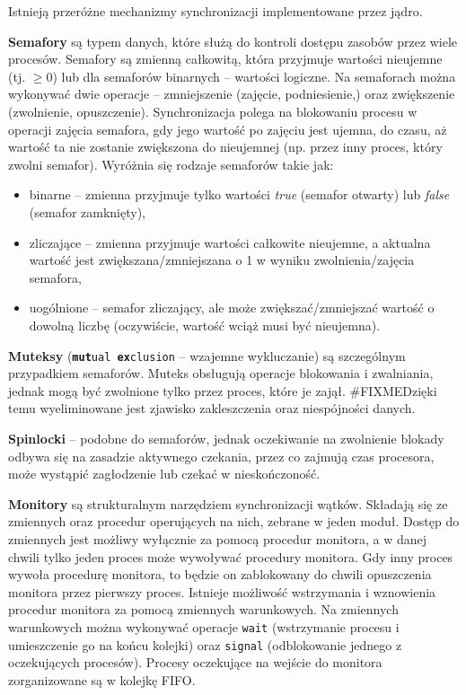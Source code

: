 Istnieją przeróżne mechanizmy synchronizacji implementowane przez jądro.

\textbf{Semafory} są typem danych, które służą do kontroli dostępu zasobów przez wiele procesów.
Semafory są zmienną całkowitą, która przyjmuje wartości nieujemne (tj. $\ge 0$) lub dla semaforów binarnych -- wartości logiczne.
Na semaforach można wykonywać dwie operacje -- zmniejszenie (zajęcie, podniesienie,) oraz zwiększenie (zwolnienie, opuszczenie).
Synchronizacja polega na blokowaniu procesu w operacji zajęcia semafora, gdy jego wartość po zajęciu jest ujemna, do czasu, aż wartość ta nie zostanie zwiększona do nieujemnej (np. przez inny proces, który zwolni semafor).
Wyróżnia się rodzaje semaforów takie jak:
\begin{itemize}
\item binarne -- zmienna przyjmuje tylko wartości \textit{true} (semafor otwarty) lub \textit{false} (semafor zamknięty),
\item zliczające -- zmienna przyjmuje wartości całkowite nieujemne, a aktualna wartość jest zwiększana/zmniejszana o 1 w wyniku zwolnienia/zajęcia semafora,
\item uogólnione -- semafor zliczający, ale może zwiększać/zmniejszać wartość o dowolną liczbę (oczywiście, wartość wciąż musi być nieujemna).
\end{itemize}

\textbf{Muteksy} (\texttt{\textbf{mut}ual \textbf{ex}clusion} -- wzajemne wykluczanie) są szczególnym przypadkiem semaforów. Muteks obsługują operacje blokowania i zwalniania, jednak mogą być zwolnione tylko przez proces, które je zajął.
\#FIXMEDzięki temu wyeliminowane jest zjawisko zakleszczenia oraz niespójności danych.

\textbf{Spinlocki} -- podobne do semaforów, jednak oczekiwanie na zwolnienie blokady odbywa się na zasadzie aktywnego czekania, przez co zajmują czas procesora, może wystąpić zagłodzenie lub czekać w nieskończoność.

\textbf{Monitory} są strukturalnym narzędziem synchronizacji wątków. Składają się ze zmiennych oraz procedur operujących na nich, zebrane w jeden moduł. Dostęp do zmiennych jest możliwy wyłącznie za pomocą procedur monitora, a w danej chwili tylko jeden proces może wywoływać procedury monitora. Gdy inny proces wywoła procedurę monitora, to będzie on zablokowany do chwili opuszczenia monitora przez pierwszy proces. Istnieje możliwość wstrzymania i wznowienia procedur monitora za pomocą zmiennych warunkowych. Na zmiennych warunkowych można wykonywać operacje \texttt{wait} (wstrzymanie procesu i umieszczenie go na końcu kolejki) oraz \texttt{signal} (odblokowanie jednego z oczekujących procesów). Procesy oczekujące na wejście do monitora zorganizowane są w kolejkę FIFO.